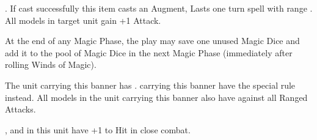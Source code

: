  . If cast successfully this item
casts an Augment, Lasts one turn spell with range . All \undead models in target unit gain +1 Attack.

 At the end of any Magic Phase, the play may save one unused Magic Dice and add it to the pool of Magic Dice in the next Magic Phase (immediately after rolling Winds of Magic).

\endpricelist

\armymagicbanners

\startpricelist

 The unit carrying this banner has \bodyguard{\vampirelord , \vampirehero}. \vampireknights carrying this banner have the \stubborn special rule instead. All models in the unit carrying this banner also have  against all Ranged Attacks.

 \barrowknights , \barrowguards and \barrowkings in this unit have +1 to Hit in close combat.

\endpricelist


\armylist

\lordstitle

